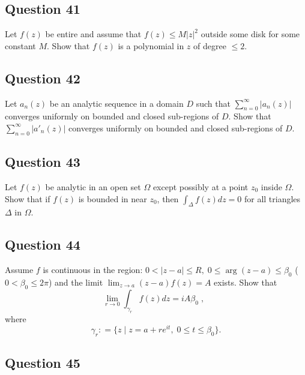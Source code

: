 \documentclass[12pt]{article}
\begin{document}
\hypertarget{question-41-2}{%
\subsection{Question 41}\label{question-41-2}}

Let \(f(z)\) be entire and assume that \(f(z) \leq M |z|^2\) outside
some disk for some constant \(M\). Show that \(f(z)\) is a polynomial in
\(z\) of degree \(\leq 2\).

\hypertarget{question-42-2}{%
\subsection{Question 42}\label{question-42-2}}

Let \(a_n(z)\) be an analytic sequence in a domain \(D\) such that
\(\displaystyle \sum_{n=0}^\infty |a_n(z)|\) converges uniformly on
bounded and closed sub-regions of \(D\). Show that
\(\displaystyle \sum_{n=0}^\infty |a'_n(z)|\) converges uniformly on
bounded and closed sub-regions of \(D\).

\hypertarget{question-43-2}{%
\subsection{Question 43}\label{question-43-2}}

Let \(f(z)\) be analytic in an open set \(\Omega\) except possibly at a
point \(z_0\) inside \(\Omega\). Show that if \(f(z)\) is bounded in
near \(z_0\), then \(\displaystyle \int_\Delta f(z) dz = 0\) for all
triangles \(\Delta\) in \(\Omega\).

\hypertarget{question-44-2}{%
\subsection{Question 44}\label{question-44-2}}

Assume \(f\) is continuous in the region:
\(0< |z-a| \leq R, \; 0 \leq \arg(z-a) \leq \beta_0\)
(\(0 < \beta_0 \leq 2 \pi\)) and the limit
\(\displaystyle \lim_{z \rightarrow a} (z-a) f(z) = A\) exists. Show
that
\[\lim_{r \rightarrow 0} \int_{\gamma_r} f(z) dz  = i A \beta_0 \; , \; \;\]
where
\[\gamma_r : = \{ z \; | \; z = a + r e^{it}, \; 0 \leq  t \leq \beta_0 \}.\]

\hypertarget{question-45-2}{%
\subsection{Question 45}\label{question-45-2}}
\end{document}
